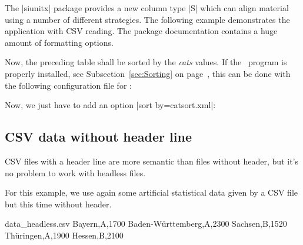 \documentclass[a4paper,11pt]{ltxdoc}
\begin{document}

The |siunitx| \cite{wright:2013a} package provides a new column type |S|
which can align material using a number of different strategies.
The following example demonstrates the application with CSV reading.
The package documentation \cite{wright:2013a} contains a huge amount
of formatting options.

\begin{dispExample}
\end{dispExample}

\clearpage
Now, the preceding table shall be sorted by the \emph{cats} values.
If the \csvsorter\ program is properly installed,
see Subsection~\ref{sec:Sorting} on page~\pageref{sec:Sorting},
this can be done with the following configuration file for \csvsorter:


Now, we just have to add an option |sort by=catsort.xml|:
\begin{dispExample}
\end{dispExample}


\clearpage
\subsection{CSV data without header line}\label{noheader}%
CSV files with a header line are more semantic than files without header,
but it's no problem to work with headless files.

For this example, we use again some artificial statistical data given by a CSV file
but this time without header.

\begin{tcbverbatimwrite}{data_headless.csv}
Bayern,A,1700
Baden-W\"{u}rttemberg,A,2300
Sachsen,B,1520
Th\"{u}ringen,A,1900
Hessen,B,2100
\end{tcbverbatimwrite}
\end{document}
